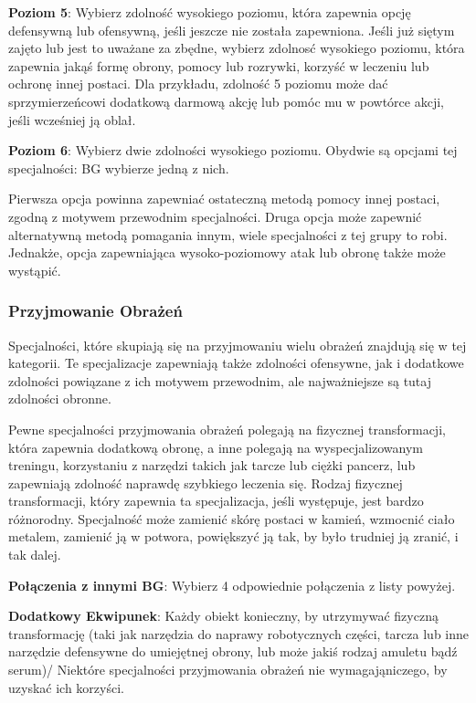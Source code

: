 \textbf{Poziom 5}: Wybierz zdolność wysokiego poziomu, która zapewnia opcję defensywną lub ofensywną, jeśli jeszcze nie została zapewniona. Jeśli już siętym zajęto lub jest to uważane za zbędne, wybierz zdolnosć wysokiego poziomu, która zapewnia jakąś formę obrony, pomocy lub rozrywki, korzyść w leczeniu lub ochronę innej postaci. Dla przykładu, zdolność 5 poziomu może dać sprzymierzeńcowi dodatkową darmową akcję lub pomóc mu w powtórce akcji, jeśli wcześniej ją oblał.

\textbf{Poziom 6}: Wybierz dwie zdolności wysokiego poziomu. Obydwie są opcjami tej specjalności: BG wybierze jedną z nich.

Pierwsza opcja powinna zapewniać ostateczną metodą pomocy innej postaci, zgodną z motywem przewodnim specjalności. Druga opcja może zapewnić alternatywną metodą pomagania innym, wiele specjalności z tej grupy to robi. Jednakże, opcja zapewniająca wysoko-poziomowy atak lub obronę także może wystąpić. 

\subsubsection{Przyjmowanie Obrażeń}

Specjalności, które skupiają się na przyjmowaniu wielu obrażeń znajdują się w tej kategorii. Te specjalizacje zapewniają także zdolności ofensywne, jak i dodatkowe zdolności powiązane z ich motywem przewodnim, ale najważniejsze są tutaj zdolności obronne.

Pewne specjalności przyjmowania obrażeń polegają na fizycznej transformacji, która zapewnia dodatkową obronę, a inne polegają na wyspecjalizowanym treningu, korzystaniu z narzędzi takich jak tarcze lub ciężki pancerz, lub zapewniają zdolność naprawdę szybkiego leczenia się. Rodzaj fizycznej transformacji, który zapewnia ta specjalizacja, jeśli występuje, jest bardzo różnorodny. Specjalność może zamienić skórę postaci w kamień, wzmocnić ciało metalem, zamienić ją w potwora, powiększyć ją tak, by było trudniej ją zranić, i tak dalej.

\textbf{Połączenia z innymi BG}: Wybierz 4 odpowiednie połączenia z listy powyżej.

\textbf{Dodatkowy Ekwipunek}: Każdy obiekt konieczny, by utrzymywać fizyczną transformację (taki jak narzędzia do naprawy robotycznych części, tarcza lub inne narzędzie defensywne do umiejętnej obrony, lub może jakiś rodzaj amuletu bądź serum)/ Niektóre specjalności przyjmowania obrażeń nie wymagająniczego, by uzyskać ich korzyści.

